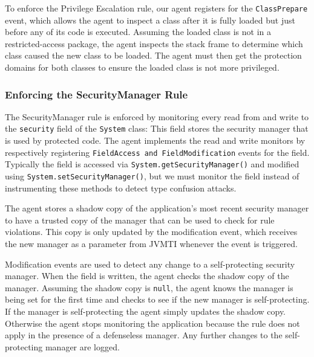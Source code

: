 \documentclass{sig-alternate}
\begin{document}
To enforce the Privilege Escalation rule, our agent registers for
the \texttt{ClassPrepare} event, which allows the agent to inspect
a class after it is fully loaded but just before any of its code is
executed. Assuming the loaded class is not in a restricted-access
package, the agent inspects the stack frame to determine which class
caused the new class to be loaded. The agent must then get the protection
domains for both classes to ensure the loaded class is not more privileged.

\subsubsection{Enforcing the SecurityManager Rule}\label{sub:Enforcing-the-SecurityManager}

The SecurityManager rule is enforced by monitoring every read from
and write to the \texttt{security} field of the \texttt{System} class:
This field stores the security manager that is used by protected code.
The agent implements the read and write monitors by respectively registering
\texttt{FieldAccess and FieldModification} events for the field. Typically
the field is accessed via \texttt{System.getSecurityManager()}
and modified using \texttt{System.setSecurityManager()}, but we must
monitor the field instead of instrumenting these methods to detect
type confusion attacks. 

The agent stores a shadow copy of the application's most recent security
manager to have a trusted copy of the manager that can be used to
check for rule violations. This copy is only
updated by the modification event, which receives the new manager
as a parameter from JVMTI whenever the event is triggered.

Modification events are used to detect any change to a self-protecting
security manager. When the field is written, the agent checks the
shadow copy of the manager. Assuming the shadow copy is \texttt{null},
the agent knows the manager is being set for the first time and checks
to see if the new manager is self-protecting. If the manager is self-protecting
the agent simply updates the shadow copy. Otherwise the agent stops monitoring the application because the rule does not apply in the presence of a defenseless manager. Any further changes to the self-protecting manager are logged.
\end{document}
